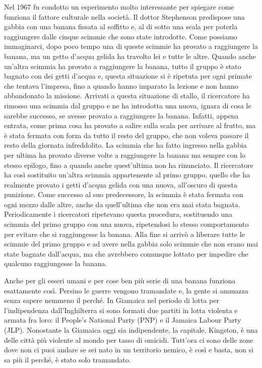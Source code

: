 \documentclass[12pt]{book} %
\begin{document}
Nel 1967 fu condotto un esperimento molto interessante per spiegare come funziona il fattore culturale nella società. Il
dottor Stephenson predispose una gabbia con una banana fissata al soffitto e, al di sotto una scala per poterla
raggiungere dalle cinque scimmie che sono state introdotte. Come possiamo immaginarci, dopo poco tempo una di queste
scimmie ha provato a raggiungere la banana, ma un getto d'acqua gelida ha travolto lei e tutte le
altre. Quando anche un'altra scimmia ha provato a raggiungere la banana, tutto il gruppo è stato
bagnato con dei getti d'acqua e, questa situazione si è ripetuta per ogni primate che tentava
l'impresa, fino a quando hanno imparato la lezione e non hanno abbandonato la missione. Arrivati a
questa situazione di stallo, il ricercatore ha rimosso una scimmia dal gruppo e ne ha introdotta una nuova, ignara di
cosa le sarebbe successo, se avesse provato a raggiungere la banana. Infatti, appena entrata, come prima cosa ha
provato a salire sulla scala per arrivare al frutto, ma è stata fermata con forza da tutto il resto del gruppo, che non
voleva passare il resto della giornata infreddolito. La scimmia che ha fatto ingresso nella gabbia per ultima ha
provato diverse volte a raggiungere la banana ma sempre con lo stesso epilogo, fino a quando anche
quest'ultima non ha rinunciato. Il ricercatore ha così sostituito un'altra
scimmia appartenente al primo gruppo, quello che ha realmente provato i getti d'acqua gelida con
una nuova, all'oscuro di questa punizione. Come successo al suo predecessore, la scimmia è stata
fermata con ogni mezzo dalle altre, anche da quell'ultima che non era mai stata bagnata.
Periodicamente i ricercatori ripetevano questa procedura, sostituendo una scimmia del primo gruppo con una nuova,
ripetendosi lo stesso comportamento per evitare che si raggiungesse la banana. Alla fine si arrivò a liberare tutte le
scimmie del primo gruppo e ad avere nella gabbia solo scimmie che non erano mai state bagnate
dall'acqua, ma che avrebbero comunque lottato per impedire che qualcuno raggiungesse la banana.

Anche per gli esseri umani e per cose ben più serie di una banana funziona esattamente così. Persino le guerre vengono
tramandate e, la gente si ammazza senza sapere nemmeno il perché. In Giamaica nel periodo di lotta per
l'indipendenza dall'Inghilterra si sono formati due partiti in lotta violenta
e armata fra loro: il People's National Party (PNP) e il Jamaica Labour Party (JLP). Nonostante la Giamaica oggi sia
indipendente, la capitale, Kingston, è una delle città più violente al mondo per tasso di omicidi.
Tutt'ora ci sono delle zone dove non ci puoi andare se sei nato in un territorio nemico, è così e
basta, non si sa più il perché, è stato solo tramandato.
\end{document}
